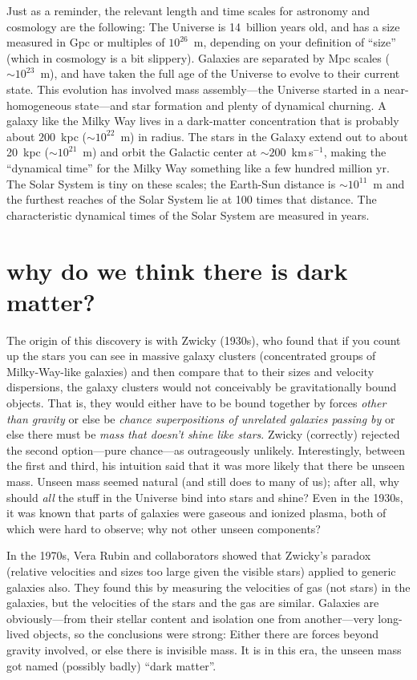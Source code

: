 \documentclass[12pt]{article}
\begin{document}
Just as a reminder, the relevant length and time scales for astronomy
and cosmology are the following: The Universe is 14~billion years old,
and has a size measured in Gpc or multiples of $10^{26}$~m, depending
on your definition of ``size'' (which in cosmology is a bit slippery).
Galaxies are separated by Mpc scales ($\sim 10^{23}$~m), and have
taken the full age of the Universe to evolve to their current state.
This evolution has involved mass assembly---the Universe started in a
near-homogeneous state---and star formation and plenty of dynamical
churning.  A galaxy like the Milky Way lives in a dark-matter
concentration that is probably about $200$~kpc ($\sim 10^{22}$~m) in
radius.  The stars in the Galaxy extend out to about 20~kpc ($\sim
10^{21}$~m) and orbit the Galactic center at $\sim 200$~km\,s$^{-1}$,
making the ``dynamical time'' for the Milky Way something like a few
hundred million yr.  The Solar System is tiny on these scales; the
Earth-Sun distance is $\sim 10^{11}$~m and the furthest reaches of the
Solar System lie at 100 times that distance.  The characteristic
dynamical times of the Solar System are measured in years.

\section{why do we think there is dark matter?}

The origin of this discovery is with Zwicky (1930s), who found that if
you count up the stars you can see in massive galaxy clusters
(concentrated groups of Milky-Way-like galaxies) and then compare that
to their sizes and velocity dispersions, the galaxy clusters would not
conceivably be gravitationally bound objects.  That is, they would
either have to be bound together by forces \emph{other than gravity}
or else be \emph{chance superpositions of unrelated galaxies passing
  by} or else there must be \emph{mass that doesn't shine like stars}.
Zwicky (correctly) rejected the second option---pure chance---as
outrageously unlikely.  Interestingly, between the first and third,
his intuition said that it was more likely that there be unseen mass.
Unseen mass seemed natural (and still does to many of us); after all,
why should \emph{all} the stuff in the Universe bind into stars and
shine?  Even in the 1930s, it was known that parts of galaxies were
gaseous and ionized plasma, both of which were hard to observe; why
not other unseen components?

In the 1970s, Vera Rubin and collaborators showed that Zwicky's
paradox (relative velocities and sizes too large given the visible
stars) applied to generic galaxies also.  They found this by measuring
the velocities of gas (not stars) in the galaxies, but the velocities
of the stars and the gas are similar.  Galaxies are obviously---from
their stellar content and isolation one from another---very long-lived
objects, so the conclusions were strong: Either there are forces
beyond gravity involved, or else there is invisible mass.  It is in
this era, the unseen mass got named (possibly badly) ``dark matter''.
\end{document}
